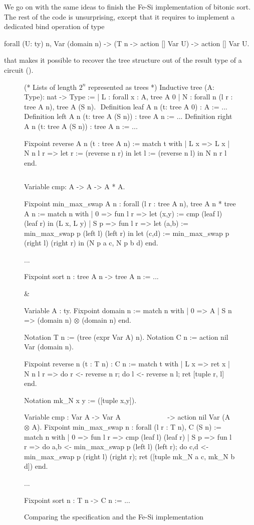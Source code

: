 \documentclass{llncs}
\begin{document}
We go on with the same ideas to finish the Fe-Si implementation of
bitonic sort. The rest of the code is unsurprising, except that it
requires to implement a dedicated bind operation of type
\begin{mcoq}
forall (U: ty) n,  Var (domain n) -> (T n -> action [] Var U) -> action [] Var U. 
\end{mcoq}
that makes it possible to recover the tree structure out of the
result type of a circuit ().

\begin{figure}[t]
  \centering
\begin{twolistings}
\begin{coq}
(* Lists of length $2^n$ represented as trees *)
Inductive tree (A: Type): nat -> Type :=
| L : forall x : A, tree A 0
| N : forall n (l r : tree A n), tree A (S n). 
$ $
Definition leaf  {A n} (t: tree A 0) : A := ...
Definition left  {A n} (t: tree A (S n)) : tree A n := ...
Definition right {A n} (t: tree A (S n)) : tree A n := ...

Fixpoint reverse {A} n (t : tree A n) :=
match t with 
| L x => L x
| N n l r => 
  let r := (reverse n r) in 
  let l := (reverse n l) in 
  N n r l
end.

$ $

Variable cmp: A -> A -> A * A.

Fixpoint min_max_swap {A} n : 
  forall (l r : tree A n), tree A n * tree A n :=
match n with 
| 0 => fun l r => 
  let (x,y) := cmp (leaf l) (leaf r) in (L x, L y)
| S p => fun l r => 
  let (a,b) := min_max_swap p (left l) (left r) in 
  let (c,d) := min_max_swap p (right l) (right r) in 
  (N p a c, N p b d)
end. 

...

Fixpoint sort n : tree A n -> tree A n := ...
\end{coq}
& $\quad$
\begin{coq}
Variable A : ty.        
Fixpoint domain n := match n with 
| 0 => A
| S n => (domain n) $\otimes$ (domain n)
end. 

Notation T n := (tree (expr Var A) n). 
Notation C n := action nil Var (domain n). 

Fixpoint reverse n (t : T n) : C n  :=
match t with 
| L x => ret x
| N n l r => 
  do r <- reverse n r;
  do l <- reverse n l;
  ret [tuple r, l]
end.

Notation mk_N x y := ([tuple x,y]).

Variable cmp : Var A -> Var A 
$\qquad\qquad\qquad$ -> action nil Var (A $\otimes$ A).
Fixpoint min_max_swap n : 
  forall (l r : T n), C (S n) :=
match n  with 
| 0 => fun l r => 
  cmp (leaf l) (leaf r)
| S p => fun l r => 
  do a,b <- min_max_swap p (left l) (left r);
  do c,d <- min_max_swap p (right l) (right r); 
  ret ([tuple mk_N a c, mk_N b d])
end.

...

Fixpoint sort n : T n -> C n := ...
\end{coq}
\end{twolistings}
  
  \caption{Comparing the specification and the Fe-Si implementation}
  \label{fig:reverse}
\end{figure}
\end{document}

